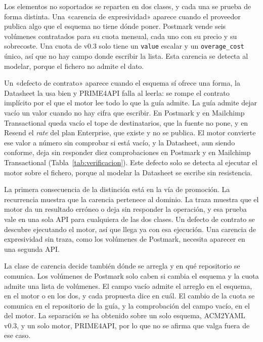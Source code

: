 Los elementos no soportados se reparten en dos clases, y cada una se prueba de forma distinta.
Una «carencia de expresividad» aparece cuando el proveedor publica algo que el esquema no tiene dónde poner.
Postmark vende seis volúmenes contratados para su cuota mensual, cada uno con su precio y su sobrecoste.
Una cuota de v0.3 solo tiene un \texttt{value} escalar y un \texttt{overage\_cost} único, así que no hay campo donde escribir la lista.
Esta carencia se detecta al modelar, porque el fichero no admite el dato.

Un «defecto de contrato» aparece cuando el esquema sí ofrece una forma, la Datasheet la usa bien y PRIME4API falla al leerla: se rompe el contrato implícito por el que el motor lee todo lo que la guía admite.
La guía admite dejar vacío un valor cuando no hay cifra que escribir.
En Postmark y en Mailchimp Transactional queda vacío el tope de destinatarios, que la fuente no pone, y en Resend el \textit{rate} del plan Enterprise, que existe y no se publica.
El motor convierte ese valor a número sin comprobar si está vacío, y la Datasheet, aun siendo conforme, deja sin responder diez comprobaciones en Postmark y en Mailchimp Transactional (Tabla~\ref{tab:verificacion}).
Este defecto solo se detecta al ejecutar el motor sobre el fichero, porque al modelar la Datasheet se escribe sin resistencia.

La primera consecuencia de la distinción está en la vía de promoción.
La recurrencia muestra que la carencia pertenece al dominio.
La traza muestra que el motor da un resultado erróneo o deja sin responder la operación, y esa prueba vale en una sola API para cualquiera de las dos clases.
Un defecto de contrato se descubre ejecutando el motor, así que llega ya con esa ejecución.
Una carencia de expresividad sin traza, como los volúmenes de Postmark, necesita aparecer en una segunda API.

La clase de carencia decide también dónde se arregla y en qué repositorio se comunica.
Los volúmenes de Postmark solo caben si cambia el esquema y la cuota admite una lista de volúmenes.
El campo vacío admite el arreglo en el esquema, en el motor o en los dos, y cada propuesta dice en cuál.
El cambio de la cuota se comunica en el repositorio de la guía, y la comprobación del campo vacío, en el del motor.
La separación se ha obtenido sobre un solo esquema, ACM2YAML v0.3, y un solo motor, PRIME4API, por lo que no se afirma que valga fuera de ese caso.

